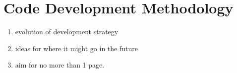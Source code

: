 
\section{Code Development Methodology}

\begin{enumerate}
\item evolution of development strategy
\item ideas for where it might go in the future
\item aim for no more than 1 page.
\end{enumerate}



